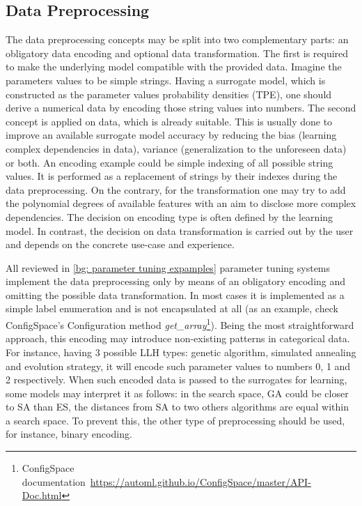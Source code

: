 \subsection{Data Preprocessing}\label{impl: preprocessing}
The data preprocessing concepts may be split into two complementary parts: an obligatory data encoding and optional data transformation. The first is required to make the underlying model compatible with the provided data. Imagine the parameters values to be simple strings. Having a surrogate model, which is constructed as the parameter values probability densities (TPE), one should derive a numerical data by encoding those string values into numbers. The second concept is applied on data, which is already suitable. This is usually done to improve an available surrogate model accuracy by reducing the bias (learning complex dependencies in data), variance (generalization to the unforeseen data) or both. An encoding example could be simple indexing of all possible string values. It is performed as a replacement of strings by their indexes during the data preprocessing. On the contrary, for the transformation one may try to add the polynomial degrees of available features with an aim to disclose more complex dependencies. The decision on encoding type is often defined by the learning model. In contrast, the decision on data transformation is carried out by the user and depends on the concrete use-case and experience.

All reviewed in \cref{bg: parameter tuning expamples} parameter tuning systems implement the data preprocessing only by means of an obligatory encoding and omitting the possible data transformation. In most cases it is implemented as a simple label enumeration and is not encapsulated at all (as an example, check ConfigSpace's Configuration method \emph{get\_array}\footnote{ConfigSpace documentation~\url{https://automl.github.io/ConfigSpace/master/API-Doc.html}}). Being the most straightforward approach, this encoding may introduce non-existing patterns in categorical data. For instance, having 3 possible LLH types: genetic algorithm, simulated annealing and evolution strategy, it will encode such parameter values to numbers 0, 1 and 2 respectively. When such encoded data is passed to the surrogates for learning, some models may interpret it as follows: in the search space, GA could be closer to SA than ES, the distances from SA to two others algorithms are equal within a search space. To prevent this, the other type of preprocessing should be used, for instance, binary encoding.

